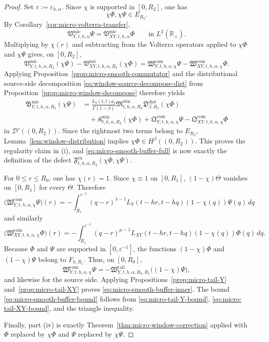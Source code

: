 \documentclass[11pt,a4paper]{amsart}
\theoremstyle{plain}
\theoremstyle{definition}
\theoremstyle{remark}
\newcommand{\R}{\mathbb{R}}
\begin{document}
\begin{proof}
Set \(\varepsilon:=\varepsilon_{h,\alpha}\). Since \(\chi\) is supported in \([0,R_2]\), one has
\[
\chi\Phi,\chi\Psi\in E_{R_2}.
\]
By Corollary~\ref{cor:micro-volterra-transfer},
\[
\mathfrak V_{Y,t,h,\alpha}^{\mathrm{mic}}\Psi
=
\mathfrak V_{XY,t,h,\alpha}^{\mathrm{mic}}\Phi
\qquad\text{in }L^2(\R_+).
\]
Multiplying by \(\chi(r)\) and subtracting from the Volterra operators applied to \(\chi\Phi\) and
\(\chi\Psi\) gives, on \([0,R_2]\),
\[
\mathfrak V_{Y,t,h,\alpha,R_2}^{\mathrm{mic}}(\chi\Psi)
-
\mathfrak V_{XY,t,h,\alpha,R_2}^{\mathrm{mic}}(\chi\Phi)
=
\mathfrak W_{Y,t,h,\alpha,\chi}^{\mathrm{com}}\Psi
-
\mathfrak W_{XY,t,h,\alpha,\chi}^{\mathrm{com}}\Phi.
\]
Applying Proposition~\ref{prop:micro-smooth-commutator} and the distributional source-side
decomposition \eqref{eq:window-source-decompose-dist} from
Proposition~\ref{prop:micro-window-decompose} therefore yields
\begin{align*}
\mathfrak B_{Y,t,h,\alpha,R_2}^{\mathrm{mic}}(\chi\Psi)
&=
\frac{L_Y(t,t)\mathbf c_t}{\Gamma(1-\beta)}
\mathfrak M_{t,h,\alpha,R_2}^{\mathrm{win}}
\mathfrak D_{\beta,R_2}^{\mathrm{dist}}(\chi\Phi)\\
&\quad+
\mathfrak K_{t,h,\alpha,R_2}^{\mathrm{win}}(\chi\Phi)
+
\mathfrak Q_{Y,t,h,\alpha,\chi}^{\mathrm{com}}\Psi
-
\mathfrak Q_{XY,t,h,\alpha,\chi}^{\mathrm{com}}\Phi
\end{align*}
in \(\mathcal D'((0,R_2))\). Since the rightmost two terms belong to \(E_{R_2}\), Lemma~\ref{lem:window-distribution}
implies \(\chi\Phi\in H^\beta((0,R_2))\). This proves the regularity claim in (i), and
\eqref{eq:micro-smooth-buffer-full} is now exactly the definition of the defect
\(\mathfrak F_{t,h,\alpha,R_2}^{\mathrm{ex}}(\chi\Phi,\chi\Psi)\).

For \(0\le r\le R_0\), one has \(\chi(r)=1\). Since \(\chi\equiv1\) on \([0,R_1]\),
\((1-\chi)\Theta\) vanishes on \([0,R_1]\) for every \(\Theta\). Therefore
\[
\bigl(
\mathfrak W_{Y,t,h,\alpha,\chi}^{\mathrm{com}}\Psi
\bigr)(r)
=
-
\int_{R_1}^{\varepsilon^{-1}}
(q-r)^{\lambda-1}
L_Y(t-hr,t-hq)(1-\chi(q))\Psi(q)\,dq
\]
and similarly
\[
\bigl(
\mathfrak W_{XY,t,h,\alpha,\chi}^{\mathrm{com}}\Phi
\bigr)(r)
=
-
\int_{R_1}^{\varepsilon^{-1}}
(q-r)^{\mu-1}
L_{XY}(t-hr,t-hq)(1-\chi(q))\Phi(q)\,dq.
\]
Because \(\Phi\) and \(\Psi\) are supported in \([0,\varepsilon^{-1}]\), the functions
\((1-\chi)\Phi\) and \((1-\chi)\Psi\) belong to \(F_{h,R_1}\). Thus, on \([0,R_0]\),
\[
\mathfrak W_{Y,t,h,\alpha,\chi}^{\mathrm{com}}\Psi
=
-\mathfrak W_{Y,t,h,\alpha,R_0,R_1}^{\mathrm{tail}}
\bigl((1-\chi)\Psi\bigr),
\]
and likewise for the source side. Applying Propositions~\ref{prop:micro-tail-Y}
and~\ref{prop:micro-tail-XY} proves \eqref{eq:micro-smooth-buffer-inner}. The bound
\eqref{eq:micro-smooth-buffer-bound} follows from
\eqref{eq:micro-tail-Y-bound}, \eqref{eq:micro-tail-XY-bound}, and the triangle inequality.

Finally, part (iv) is exactly Theorem~\ref{thm:micro-window-correction} applied with
\(\Phi\) replaced by \(\chi\Phi\) and \(\Psi\) replaced by \(\chi\Psi\).
\end{proof}
\end{document}
